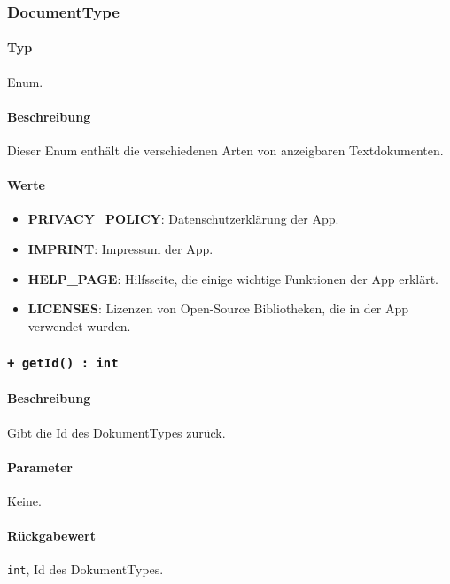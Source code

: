 \subsubsection{DocumentType}\label{App_DocumentViewer_DocumentType}
\paragraph*{Typ}
Enum.
\paragraph*{Beschreibung}
Dieser Enum enthält die verschiedenen Arten von anzeigbaren Textdokumenten.

\paragraph*{Werte}
\begin{itemize}
    \item \textbf{PRIVACY\_POLICY}: Datenschutzerklärung der App.
    \item \textbf{IMPRINT}: Impressum der App.
    \item \textbf{HELP\_PAGE}: Hilfsseite, die einige wichtige Funktionen der App erklärt.
    \item \textbf{LICENSES}: Lizenzen von Open-Source Bibliotheken, die in der App verwendet wurden.
\end{itemize}

\subsubsection*{\texttt{+ getId() : int}}\label{App_DocumentViewer_DocumentType_getId}%
\paragraph*{Beschreibung}
Gibt die Id des DokumentTypes zurück.
\paragraph*{Parameter}
Keine.
\paragraph*{Rückgabewert}
\texttt{int}, Id des DokumentTypes.
